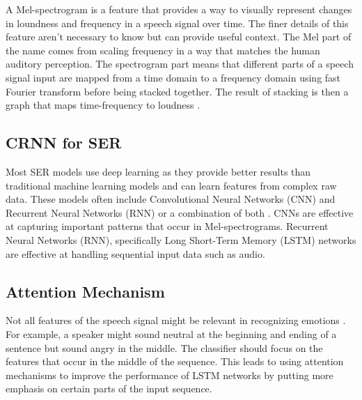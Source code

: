 \documentclass[../main.tex]{subfiles}
\begin{document}
A Mel-spectrogram is a feature that provides a way to visually represent changes in loundness 
and frequency in a speech signal over time. The finer details of this
feature aren't necessary to know but can provide useful context. The Mel part of the name comes 
from scaling frequency in a way that matches the human auditory perception. 
The spectrogram part means that different parts of a speech 
signal input are mapped from a time domain to a frequency domain using 
fast Fourier transform before being stacked together. The result of stacking is 
then a graph that maps time-frequency to loudness \citep{Roberts2020}. 

\subsection{CRNN for SER} 
Most SER models use deep learning as they provide 
better results than traditional machine learning models and can learn features 
from complex raw data. These models often include Convolutional Neural Networks 
(CNN) and Recurrent Neural Networks (RNN) or a combination of both \citep{Hashem2023}. CNNs are 
effective at capturing important patterns that occur in Mel-spectrograms. 
Recurrent Neural Networks (RNN), specifically Long Short-Term Memory (LSTM) 
networks are effective at handling sequential input data such as audio.

\subsection{Attention Mechanism} 
Not all features of the speech signal might 
be relevant in recognizing emotions \citep{Hashem2023}. For example, a speaker might sound neutral 
at the beginning and ending of a sentence but sound angry in the middle. The 
classifier should focus on the features that occur in the middle of the 
sequence. This leads to using attention mechanisms to improve the performance 
of LSTM networks by putting more emphasis on certain parts of the input 
sequence.
\end{document}
